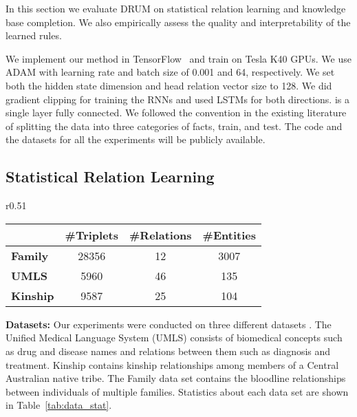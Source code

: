 \documentclass{article}
\begin{document}
In this section we evaluate DRUM on statistical relation learning and knowledge base completion. We also empirically assess the quality and interpretability of the learned rules.

We implement our method in TensorFlow~\cite{tensorflow2015-whitepaper} and train on Tesla K40 GPUs. We use ADAM \cite{kingma2014adam} with learning rate and batch size of 0.001 and 64, respectively. We set both the hidden state dimension and head relation vector size to 128. We did gradient clipping for training the RNNs and used LSTMs \cite{hochreiter1997long} for both directions.  is a single layer fully connected. We followed the convention in the existing literature \citep{yang2017differentiable} of splitting the data into three categories of facts, train, and test. The code and the datasets for all the experiments will be publicly available.

\vspace{5pt}

\subsection{Statistical Relation Learning}
\label{sec:srl}


\begin{wraptable}{r}{0.51\textwidth}
\vspace{-20pt}
\caption{Dataset statistics for statistical relation learning}\label{tab:data_stat}
\begin{tabular}{lccc}
\toprule
& \textbf{\#Triplets} & \textbf{\#Relations} & \textbf{\#Entities} \\ 
\midrule
\textbf{Family}  & 28356                & 12                    & 3007               \\
\textbf{UMLS}    & 5960                 & 46                    & 135                \\
\textbf{Kinship} & 9587                 & 25                    & 104                \\
\bottomrule
\end{tabular}
\end{wraptable} 

\textbf{Datasets:} Our experiments were conducted on three different datasets \cite{kok2007statistical}. The Unified Medical Language System (UMLS) consists of biomedical concepts such as drug and disease names and relations between them such as diagnosis and treatment. Kinship contains kinship relationships among members of a Central Australian native tribe. The Family data set contains the bloodline relationships between individuals of multiple families. Statistics about each data set are shown in  Table~\ref{tab:data_stat}.
\end{document}
